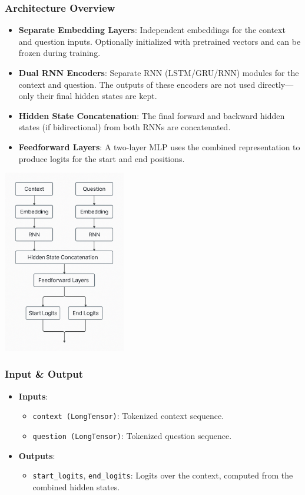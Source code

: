 \documentclass[runningheads]{llncs}
\begin{document}
\subsubsection{Architecture Overview}
\begin{itemize}
    \item \textbf{Separate Embedding Layers}: Independent embeddings for the context and question inputs. Optionally initialized with pretrained vectors and can be frozen during training.
    \item \textbf{Dual RNN Encoders}: Separate RNN (LSTM/GRU/RNN) modules for the context and question. The outputs of these encoders are not used directly—only their final hidden states are kept.
    \item \textbf{Hidden State Concatenation}: The final forward and backward hidden states (if bidirectional) from both RNNs are concatenated.
    \item \textbf{Feedforward Layers}: A two-layer MLP uses the combined representation to produce logits for the start and end positions.
\end{itemize}

\begin{center}
    \includegraphics[width=0.4\textwidth]{images/model1.png}
\end{center}

\subsubsection{Input \& Output}
\begin{itemize}
    \item \textbf{Inputs}:
    \begin{itemize}
        \item \texttt{context (LongTensor)}: Tokenized context sequence.
        \item \texttt{question (LongTensor)}: Tokenized question sequence.
    \end{itemize}
    \item \textbf{Outputs}:
    \begin{itemize}
        \item \texttt{start\_logits}, \texttt{end\_logits}: Logits over the context, computed from the combined hidden states.
    \end{itemize}
\end{itemize}
\end{document}

